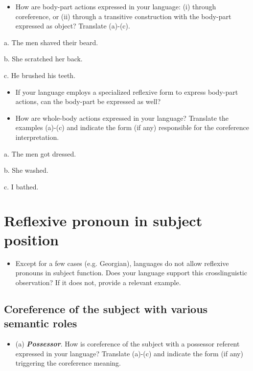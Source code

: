 \documentclass[output=paper]{langsci/langscibook} \label{AppendixA}
\begin{document}
\begin{itemize}
\item
How are body-part actions expressed in your language: (i) through coreference, or (ii) through a transitive construction with the body-part expressed as object? Translate (a)-(c). 

\end{itemize}

a.  The men shaved their beard. 



b.  She scratched her back. 



c.  He brushed his teeth. 


\begin{itemize}
\item
If your language employs a specialized reflexive form to express body-part actions, can the body-part be expressed as well? 

\item
How are whole-body actions expressed in your language? Translate the examples (a)-(c) and indicate the form (if any) responsible for the coreference interpretation. 

\end{itemize}

a.  The men got dressed.



b. She washed. 



c. I bathed. 


\section{Reflexive pronoun in subject position} 
\begin{itemize}
\item
Except for a few cases (e.g. Georgian), languages do not allow reflexive pronouns in subject function. Does your language support this crosslinguistic observation? If it does not, provide a relevant example. 

\end{itemize}
\subsection{Coreference of the subject with various semantic roles} 
\begin{itemize}
\item
(a)  \textbf{\textit{Possessor}}. How is coreference of the subject with a possessor referent expressed in your language? Translate (a)-(c) and indicate the form (if any) triggering the coreference meaning. 

\end{itemize}
\end{document}
